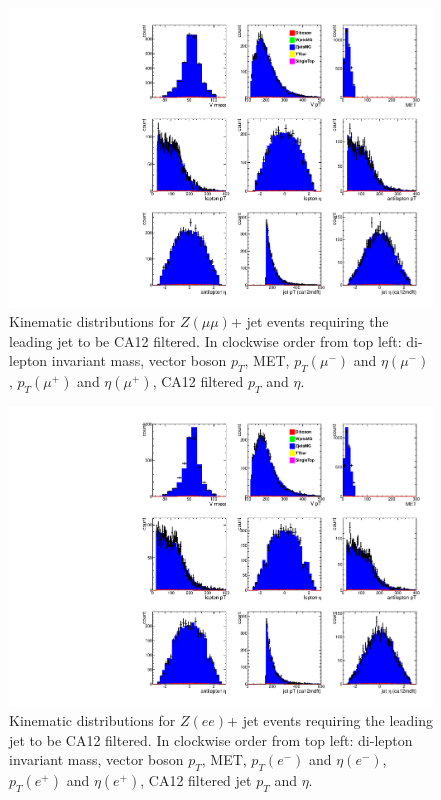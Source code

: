 \clearpage

\begin{figure}[htb]
\centering
\includegraphics[width=1.0\textwidth]{figs/kinematics_stack_ca12_Zmumu.pdf}
\caption{Kinematic distributions for $Z(\mu\mu)$+ jet events requiring the leading jet to be CA12 filtered. In clockwise order from top left: di-lepton invariant mass, vector boson $p_T$, MET, $p_T (\mu^-)$ and $\eta (\mu^-)$, $p_T (\mu^+)$ and $\eta (\mu^+)$, CA12 filtered $p_T$ and $\eta$.}
\label{figs:kin1_CA12}
\end{figure}

\begin{figure}[htb]
\centering
\includegraphics[width=1.0\textwidth]{figs/kinematics_stack_ca12_Zee.pdf}
\caption{Kinematic distributions for $Z(ee)$+ jet events requiring the leading jet to be CA12 filtered. In clockwise order from top left: di-lepton invariant mass, vector boson $p_T$, MET, $p_T (e^-)$ and $\eta (e^-)$, $p_T (e^+)$ and $\eta (e^+)$, CA12 filtered jet $p_T$ and $\eta$.}
\label{figs:kin2_CA12}
\end{figure}

